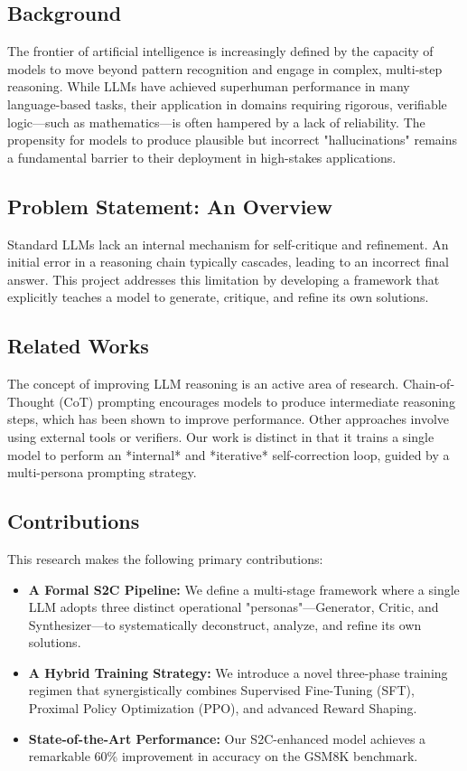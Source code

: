 \documentclass[conference]{IEEEtran}
\begin{document}
\subsection{Background}
The frontier of artificial intelligence is increasingly defined by the capacity of models to move beyond pattern recognition and engage in complex, multi-step reasoning. While LLMs have achieved superhuman performance in many language-based tasks, their application in domains requiring rigorous, verifiable logic—such as mathematics—is often hampered by a lack of reliability. The propensity for models to produce plausible but incorrect "hallucinations" remains a fundamental barrier to their deployment in high-stakes applications.

\subsection{Problem Statement: An Overview}
Standard LLMs lack an internal mechanism for self-critique and refinement. An initial error in a reasoning chain typically cascades, leading to an incorrect final answer. This project addresses this limitation by developing a framework that explicitly teaches a model to generate, critique, and refine its own solutions.

\subsection{Related Works}
The concept of improving LLM reasoning is an active area of research. Chain-of-Thought (CoT) prompting \cite{b1} encourages models to produce intermediate reasoning steps, which has been shown to improve performance. Other approaches involve using external tools or verifiers. Our work is distinct in that it trains a single model to perform an *internal* and *iterative* self-correction loop, guided by a multi-persona prompting strategy.

\subsection{Contributions}
This research makes the following primary contributions:
\begin{itemize}
    \item \textbf{A Formal S2C Pipeline:} We define a multi-stage framework where a single LLM adopts three distinct operational "personas"—Generator, Critic, and Synthesizer—to systematically deconstruct, analyze, and refine its own solutions.
    \item \textbf{A Hybrid Training Strategy:} We introduce a novel three-phase training regimen that synergistically combines Supervised Fine-Tuning (SFT), Proximal Policy Optimization (PPO), and advanced Reward Shaping.
    \item \textbf{State-of-the-Art Performance:} Our S2C-enhanced model achieves a remarkable 60\% improvement in accuracy on the GSM8K benchmark.
\end{itemize}
\end{document}
